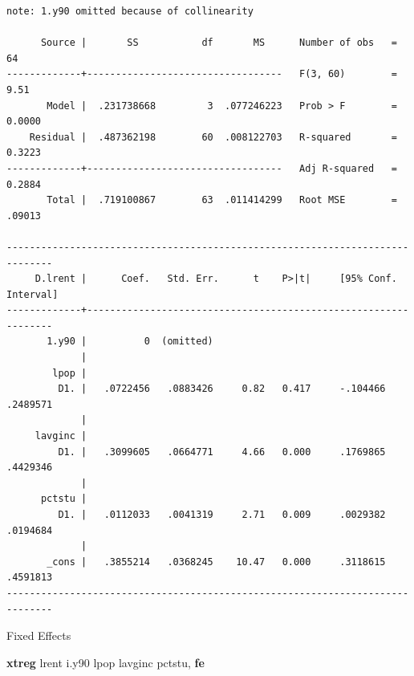 \documentclass[
]{book}
\newenvironment{Shaded}{\begin{snugshade}}{\end{snugshade}}
\newcommand{\KeywordTok}[1]{\textcolor[rgb]{0.13,0.29,0.53}{\textbf{#1}}}
\newcommand{\NormalTok}[1]{#1}
\begin{document}
\begin{verbatim}
note: 1.y90 omitted because of collinearity

      Source |       SS           df       MS      Number of obs   =        64
-------------+----------------------------------   F(3, 60)        =      9.51
       Model |  .231738668         3  .077246223   Prob > F        =    0.0000
    Residual |  .487362198        60  .008122703   R-squared       =    0.3223
-------------+----------------------------------   Adj R-squared   =    0.2884
       Total |  .719100867        63  .011414299   Root MSE        =    .09013

------------------------------------------------------------------------------
     D.lrent |      Coef.   Std. Err.      t    P>|t|     [95% Conf. Interval]
-------------+----------------------------------------------------------------
       1.y90 |          0  (omitted)
             |
        lpop |
         D1. |   .0722456   .0883426     0.82   0.417     -.104466    .2489571
             |
     lavginc |
         D1. |   .3099605   .0664771     4.66   0.000     .1769865    .4429346
             |
      pctstu |
         D1. |   .0112033   .0041319     2.71   0.009     .0029382    .0194684
             |
       _cons |   .3855214   .0368245    10.47   0.000     .3118615    .4591813
------------------------------------------------------------------------------
\end{verbatim}

Fixed Effects

\begin{Shaded}
\begin{Highlighting}[]
\KeywordTok{xtreg}\NormalTok{ lrent i.y90 lpop lavginc pctstu, }\KeywordTok{fe}
\end{Highlighting}
\end{Shaded}
\end{document}
